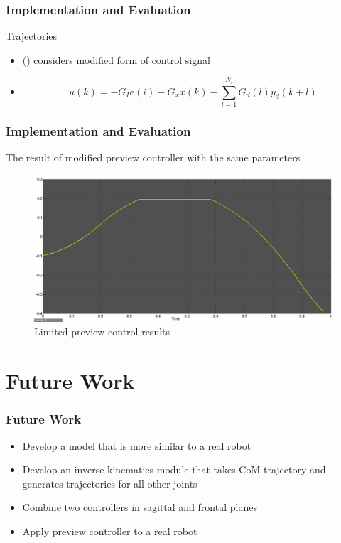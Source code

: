 \documentclass{beamer}
\begin{document}

	\begin{frame}
		\frametitle{Implementation and Evaluation}
		\begin{block}{Trajectories}
			\begin{itemize}
				\item
					(\cite{choi2006fuzzy}) considers modified form of control signal
				\item
					\begin{equation}
						u(k) = -G_I e(i) - G_xx(k) - \sum^{N_l}_{l=1}G_d(l)y_d(k+l)
					\end{equation}
			\end{itemize}
		\end{block}
	\end{frame}
	

	\begin{frame}
		\frametitle{Implementation and Evaluation}
		The result of modified preview controller with the same parameters
		
		\begin{figure}[h!]
			\centering
			\includegraphics[width=0.8\linewidth]{presentation_images/30}
			\caption{Limited preview control results}
		\end{figure}
	\end{frame}
	

	\section*{Future Work}
	\begin{frame}
		\frametitle{Future Work}
		\begin{itemize}
			\item
				Develop a model that is more similar to a real robot
			\item
				Develop an inverse kinematics module that takes CoM trajectory and generates trajectories for all other joints
			\item
				Combine two controllers in sagittal and frontal planes
			\item
				Apply preview controller to a real robot
		\end{itemize}
	\end{frame}
	
\end{document}
